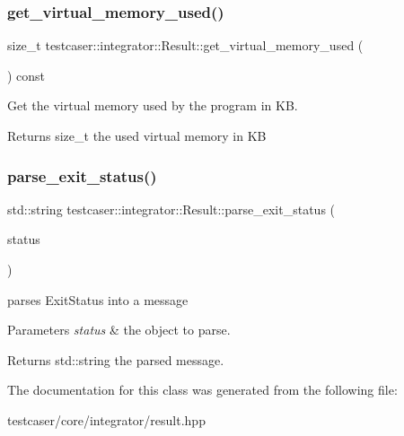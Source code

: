 \subsubsection{\texorpdfstring{get\+\_\+virtual\+\_\+memory\+\_\+used()}{get\_virtual\_memory\_used()}}
{\footnotesize\ttfamily size\+\_\+t testcaser\+::integrator\+::\+Result\+::get\+\_\+virtual\+\_\+memory\+\_\+used (\begin{DoxyParamCaption}{ }\end{DoxyParamCaption}) const\hspace{0.3cm}{\ttfamily [inline]}}



Get the virtual memory used by the program in KB. 

\begin{DoxyReturn}{Returns}
size\+\_\+t the used virtual memory in KB 
\end{DoxyReturn}
\mbox{\label{classtestcaser_1_1integrator_1_1Result_a8803ea04076142e32e6784f0324b7186}} 
\subsubsection{\texorpdfstring{parse\+\_\+exit\+\_\+status()}{parse\_exit\_status()}}
{\footnotesize\ttfamily std\+::string testcaser\+::integrator\+::\+Result\+::parse\+\_\+exit\+\_\+status (\begin{DoxyParamCaption}\item[{\hyperlink{namespacetestcaser_1_1integrator_a68fcfdfd3f063954e9fd1a94f4b4f755}{testcaser\+::integrator\+::\+Exit\+Status}}]{status }\end{DoxyParamCaption})\hspace{0.3cm}{\ttfamily [inline]}}



parses Exit\+Status into a message 


\begin{DoxyParams}{Parameters}
{\em status} & the object to parse. \\
\hline
\end{DoxyParams}
\begin{DoxyReturn}{Returns}
std\+::string the parsed message. 
\end{DoxyReturn}


The documentation for this class was generated from the following file\+:\begin{DoxyCompactItemize}
\item 
testcaser/core/integrator/result.\+hpp\end{DoxyCompactItemize}
